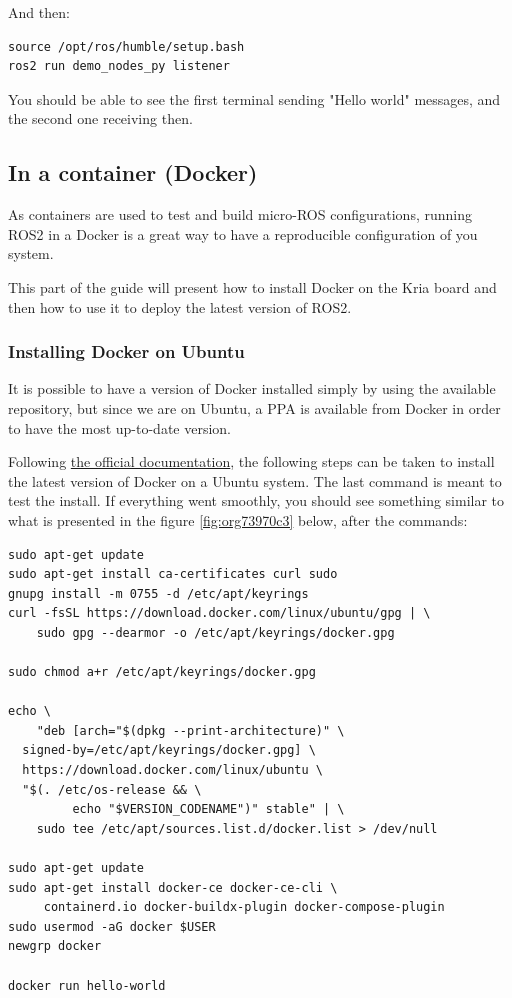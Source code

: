 \documentclass[10pt]{article}
\begin{document}
And then:
\begin{verbatim}
source /opt/ros/humble/setup.bash
ros2 run demo_nodes_py listener
\end{verbatim}

You should be able to see the first terminal sending "Hello world" messages,
and the second one receiving then.

\subsection{In a container (Docker)}
\label{sec:orge02915c}
As containers are used to test and build micro-ROS configurations,
running ROS2 in a Docker  is a great way to have a reproducible configuration
of you system.

This part of the guide will present how to install Docker on the
Kria board and then how to use it to deploy the latest version of ROS2.

\subsubsection{Installing Docker on Ubuntu}
\label{sec:org05327e8}
It is possible to have a version of Docker installed simply by using the available repository,
but since we are on Ubuntu, a PPA is available from Docker in order to have the most up-to-date version.

Following \href{https://docs.docker.com/engine/install/ubuntu/\#install-using-the-repository}{the official documentation}, the following steps can be taken to install the latest version of
Docker on a Ubuntu system. The last command is meant to test the install.
If everything went smoothly, you should see something similar to what is presented
in the figure \ref{fig:org73970c3} below, after the commands:

\begin{verbatim}
sudo apt-get update
sudo apt-get install ca-certificates curl sudo
gnupg install -m 0755 -d /etc/apt/keyrings
curl -fsSL https://download.docker.com/linux/ubuntu/gpg | \
    sudo gpg --dearmor -o /etc/apt/keyrings/docker.gpg

sudo chmod a+r /etc/apt/keyrings/docker.gpg

echo \
    "deb [arch="$(dpkg --print-architecture)" \
  signed-by=/etc/apt/keyrings/docker.gpg] \
  https://download.docker.com/linux/ubuntu \
  "$(. /etc/os-release && \
         echo "$VERSION_CODENAME")" stable" | \
    sudo tee /etc/apt/sources.list.d/docker.list > /dev/null

sudo apt-get update
sudo apt-get install docker-ce docker-ce-cli \
     containerd.io docker-buildx-plugin docker-compose-plugin
sudo usermod -aG docker $USER
newgrp docker

docker run hello-world
\end{verbatim}
\end{document}
